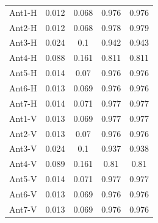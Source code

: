 \begin{table}[H]
\begin{center}
{\begin{tabular}{| c | c | c | c | c |}
Ant1-H&0.012 & 0.068 & 0.976    & 0.976     \\
Ant2-H&0.012 & 0.068 & 0.978    & 0.979     \\
Ant3-H&0.024 & 0.1   & 0.942    & 0.943     \\
Ant4-H&0.088 & 0.161 & 0.811    & 0.811     \\
Ant5-H&0.014 & 0.07  & 0.976    & 0.976     \\
Ant6-H&0.013 & 0.069 & 0.976    & 0.976     \\
Ant7-H&0.014 & 0.071 & 0.977    & 0.977     \\
Ant1-V&0.013 & 0.069 & 0.977    & 0.977     \\
Ant2-V&0.013 & 0.07  & 0.976    & 0.976     \\
Ant3-V&0.024 & 0.1   & 0.937    & 0.938     \\
Ant4-V&0.089 & 0.161 & 0.81     & 0.81      \\
Ant5-V&0.014 & 0.071 & 0.977    & 0.977     \\
Ant6-V&0.013 & 0.069 & 0.976    & 0.976     \\
Ant7-V&0.013 & 0.069 & 0.976    & 0.976    \\ 
 \hline
\end{tabular}}
\end{center}
\end{table}

